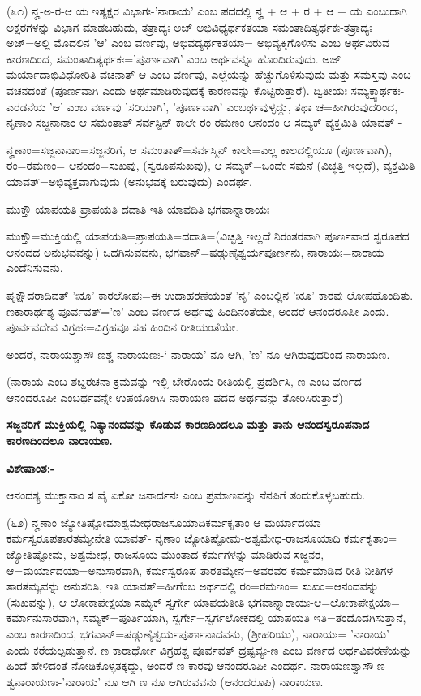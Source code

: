 (೬೧) ನೄ-ಅ-ರ-ಆ ಯ ಇತ್ಯಕ್ಷರ ವಿಭಾಗಃ-'ನಾರಾಯ' ಎಂಬ ಪದದಲ್ಲಿ ನೄ + ಆ + ರ + ಆ + ಯ ಎಂಬುದಾಗಿ ಅಕ್ಷರಗಳನ್ನು ವಿಭಾಗ ಮಾಡಬಹುದು, ತತ್ರಾದ್ಯಃ ಅಜ್ ಅಭಿವಿಧ್ಯರ್ಥಕತಯಾ ಸಮಂತಾದಿತ್ಯರ್ಥಕಃ-ತತ್ರಾದ್ಯಃ ಅಜ್=ಅಲ್ಲಿ ಮೊದಲಿನ 'ಆ' ಎಂಬ ವರ್ಣವು, ಅಭಿವದ್ಯರ್ಥಕತಯಾ= ಅಭಿವ್ಯಕ್ತಿಗೊಳಿಸು ಎಂಬ ಅರ್ಥವಿರುವ ಕಾರಣದಿಂದ, ಸಮಂತಾದಿತ್ಯರ್ಥಕಃ='ಪೂರ್ಣವಾಗಿ' ಎಂಬ ಅರ್ಥವನ್ನೂ ಹೊಂದಿರುವುದು. ಅಜ್ ಮರ್ಯಾದಾಭಿವಿಧೋರಿತಿ ವಚನಾತ್-ಆ ಎಂಬ ವರ್ಣವು, ಎಲ್ಲೆಯನ್ನು ಹೆಚ್ಚುಗೊಳಿಸುವುದು ಮತ್ತು ಸಮಸ್ತವು ಎಂಬ ವಚನದಂತೆ (ಪೂರ್ಣವಾಗಿ ಎಂದು ಅರ್ಥಮಾಡಿರುವುದಕ್ಕೆ ಕಾರಣವನ್ನು ಕೊಟ್ಟಿರುತ್ತಾರೆ). ದ್ವಿತೀಯಃ ಸಮ್ಯಕ್ತ್ವಾರ್ಥಕಃ-ಎರಡನೆಯ 'ಆ' ಎಂಬ ವರ್ಣವು 'ಸರಿಯಾಗಿ', 'ಪೂರ್ಣವಾಗಿ' ಎಂಬರ್ಥವುಳ್ಳದ್ದು, ತಥಾ ಚ=ಹೀಗಿರುವುದರಿಂದ, ನೃಣಾಂ ಸಜ್ಜನಾನಾಂ ಆ ಸಮಂತಾತ್ ಸರ್ವಸ್ಟಿನ್ ಕಾಲೇ ರಂ ರಮಣಂ ಆನಂದಂ ಆ ಸಮ್ಯಕ್ ವ್ಯಕ್ತಮಿತಿ ಯಾವತ್ - 

ನೄಣಾಂ=ಸಜ್ಜನಾನಾಂ=ಸಜ್ಜನರಿಗೆ, ಆ ಸಮಂತಾತ್=ಸರ್ವಸ್ಮಿನ್ ಕಾಲೇ=ಎಲ್ಲ ಕಾಲದಲ್ಲಿಯೂ (ಪೂರ್ಣವಾಗಿ), ರಂ=ರಮಣಂ= ಆನಂದಂ=ಸುಖವು, (ಸ್ವರೂಪಸುಖವು), ಆ ಸಮ್ಯಕ್=ಒಂದೇ ಸಮನೆ (ವಿಚ್ಛತ್ತಿ ಇಲ್ಲದೆ), ವ್ಯಕ್ತಮಿತಿ ಯಾವತ್=ಅಭಿವ್ಯಕ್ತವಾಗುವುದು (ಅನುಭವಕ್ಕೆ ಬರುವುದು) ಎಂದರ್ಥ.

ಮುಕ್ತೌ ಯಾಪಯತಿ ಪ್ರಾಪಯತಿ ದದಾತಿ ಇತಿ ಯಾವದಿತಿ ಭಗವಾನ್ನಾರಾಯಃ

ಮುಕ್ತೌ=ಮುಕ್ತಿಯಲ್ಲಿ ಯಾಪಯತಿ=ಪ್ರಾಪಯತಿ=ದದಾತಿ=(ವಿಚ್ಛತ್ತಿ ಇಲ್ಲದೆ ನಿರಂತರವಾಗಿ ಪೂರ್ಣವಾದ ಸ್ವರೂಪದ ಆನಂದದ ಅನುಭವವನ್ನು) ಒದಗಿಸುವವನು, ಭಗವಾನ್=ಷಡ್ಗುಣೈಶ್ವರ್ಯಪೂರ್ಣನು, ನಾರಾಯಃ=ನಾರಾಯ ಎಂದೆನಿಸುವನು.

ಪೃಕ್ಷೌದರಾದಿವತ್ 'ೠ' ಕಾರಲೋಪಃ=ಈ ಉದಾಹರಣೆಯಂತೆ 'ನೃ' ಎಂಬಲ್ಲಿನ 'ೠ' ಕಾರವು ಲೋಪಹೊಂದಿತು. ಣಕಾರಾರ್ಥಶ್ಯ ಪೂರ್ವವತ್='ಣ' ಎಂಬ ವರ್ಣದ ಅರ್ಥವು ಹಿಂದಿನಂತೆಯೇ, ಅಂದರೆ ಆನಂದರೂಪೀ ಎಂದು. ಪೂರ್ವವದೇವ ವಿಗ್ರಹಃ=ವಿಗ್ರಹವೂ ಸಹ ಹಿಂದಿನ ರೀತಿಯಂತೆಯೇ.

ಅಂದರೆ, ನಾರಾಯಶ್ಚಾಸೌ ಣಶ್ಚ ನಾರಾಯಣಃ-` ನಾರಾಯ' ನೂ ಆಗಿ, 'ಣ' ನೂ ಆಗಿರುವುದರಿಂದ ನಾರಾಯಣ.

(ನಾರಾಯ ಎಂಬ ಶಬ್ದರಚನಾ ಕ್ರಮವನ್ನು ಇಲ್ಲಿ ಬೇರೊಂದು ರೀತಿಯಲ್ಲಿ ಪ್ರದರ್ಶಿಸಿ, ಣ ಎಂಬ ವರ್ಣದ ಆನಂದರೂಪೀ ಎಂಬರ್ಥವನ್ನೇ ಉಪಯೋಗಿಸಿ ನಾರಾಯಣ ಪದದ ಅರ್ಥವನ್ನು ತೋರಿಸಿರುತ್ತಾರೆ)

\begin{center}
\textbf{ಸಜ್ಜನರಿಗೆ ಮುಕ್ತಿಯಲ್ಲಿ ನಿತ್ಯಾನಂದವನ್ನು ಕೊಡುವ ಕಾರಣದಿಂದಲೂ ಮತ್ತು ತಾನು ಆನಂದಸ್ವರೂಪನಾದ ಕಾರಣದಿಂದಲೂ ನಾರಾಯಣ.}
\end{center}

\noindent
\textbf{ವಿಶೇಷಾಂಶ:-}

ಆನಂದಶ್ಯ ಮುಕ್ತಾನಾಂ ಸ ವೈ ಏಕೋ ಜನಾರ್ದನಃ ಎಂಬ ಪ್ರಮಾಣವನ್ನು ನೆನಪಿಗೆ ತಂದುಕೊಳ್ಳಬಹುದು.

(೬೨) ನೄಣಾಂ ಜ್ಯೋತಿಷ್ಟೋಮಾಶ್ವಮೇಧರಾಜಸೂಯಾದಿಕರ್ಮಕೃತಾಂ ಆ ಮರ್ಯಾದಯಾ ಕರ್ಮಸ್ವರೂಪತಾರತಮ್ಯೇನೇತಿ ಯಾವತ್- ನೃಣಾಂ ಜ್ಯೋತಿಷ್ಟೋಮ-ಅಶ್ವಮೇಧ-ರಾಜಸೂಯಾದಿ ಕರ್ಮಕೃತಾಂ= ಜ್ಯೋತಿಷ್ಟೋಮ, ಅಶ್ವಮೇಧ, ರಾಜಸೂಯ ಮುಂತಾದ ಕರ್ಮಗಳನ್ನು ಮಾಡಿರುವ ಸಜ್ಜನರ, ಆ=ಮರ್ಯಾದಯಾ=ಅನುಸಾರವಾಗಿ, ಕರ್ಮಸ್ವರೂಪ ತಾರತಮ್ಯೇನ=ಅವರವರ ಕರ್ಮಮಾಡಿದ ರೀತಿ ನೀತಿಗಳ ತಾರತಮ್ಯವನ್ನು ಅನುಸರಿಸಿ, ಇತಿ ಯಾವತ್=ಹೀಗೆಂಬ ಅರ್ಥದಲ್ಲಿ ರಂ=ರಮಣಂ= ಸುಖಂ=ಆನಂದವನ್ನು (ಸುಖವನ್ನು), ಆ ಲೋಕಾಪೇಕ್ಷಯಾ ಸಮ್ಯಕ್ ಸ್ವರ್ಗೇ ಯಾಪಯತೀತಿ ಭಗವಾನ್ನಾರಾಯಃ-ಆ=ಲೋಕಾಪೇಕ್ಷಯಾ= ಕರ್ಮಾನುಸಾರವಾಗಿ, ಸಮ್ಯಕ್=ಪೂರ್ತಿಯಾಗಿ, ಸ್ವರ್ಗೇ=ಸ್ವರ್ಗಲೋಕದಲ್ಲಿ ಯಾಪಯತಿ ಇತಿ=ತಂದೊದಗಿಸುತ್ತಾನೆ, ಎಂಬ ಕಾರಣದಿಂದ, ಭಗವಾನ್=ಷಡ್ಗುಣೈಶ್ವರ್ಯಪೂರ್ಣನಾದವನು, (ಶ‍್ರೀಹರಿಯು), ನಾರಾಯಃ= 'ನಾರಾಯ' ಎಂದು ಕರೆಯಲ್ಪಡುತ್ತಾನೆ. ಣ ಕಾರಾರ್ಥೋ ವಿಗ್ರಹಶ್ಚ ಪೂರ್ವವತ್ ದ್ರಷ್ಟವ್ಯಃ-ಣ ಎಂಬ ವರ್ಣದ ಅರ್ಥವಿವರಣೆಯನ್ನು ಹಿಂದೆ ಹೇಳಿದಂತೆ ನೋಡಿಕೊಳ್ಳತಕ್ಕದ್ದು, ಅಂದರೆ ಣ ಕಾರವು ಆನಂದರೂಪೀ ಎಂದರ್ಥ. ನಾರಾಯಣಶ್ವಾಸೌ ಣ ಶ್ವನಾರಾಯಣಃ-'ನಾರಾಯ' ನೂ ಆಗಿ ಣ ನೂ ಆಗಿರುವವನು (ಆನಂದರೂಪಿ) ನಾರಾಯಣ.

